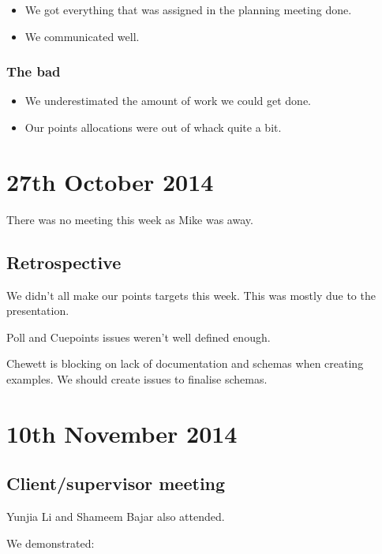 \begin{itemize}
\itemsep1pt\parskip0pt
\item
  We got everything that was assigned in the planning meeting done.
\item
  We communicated well.
\end{itemize}

\subsubsection{The bad}

\begin{itemize}
\itemsep1pt\parskip0pt
\item
  We underestimated the amount of work we could get done.
\item
  Our points allocations were out of whack quite a bit.
\end{itemize}

\section{27th October 2014}\label{Minutes:2014-10-27}

There was no meeting this week as Mike was away.

\subsection{Retrospective}

We didn't all make our points targets this week. This was mostly due to
the presentation.

Poll and Cuepoints issues weren't well defined enough.

Chewett is blocking on lack of documentation and schemas when creating
examples. We should create issues to finalise schemas.

\section{10th November 2014}\label{Minutes:2014-11-10}

\subsection{Client/supervisor meeting}
\label{subsection:Meeting10Nov}

Yunjia Li and Shameem Bajar also attended.

\newpage
We demonstrated:

